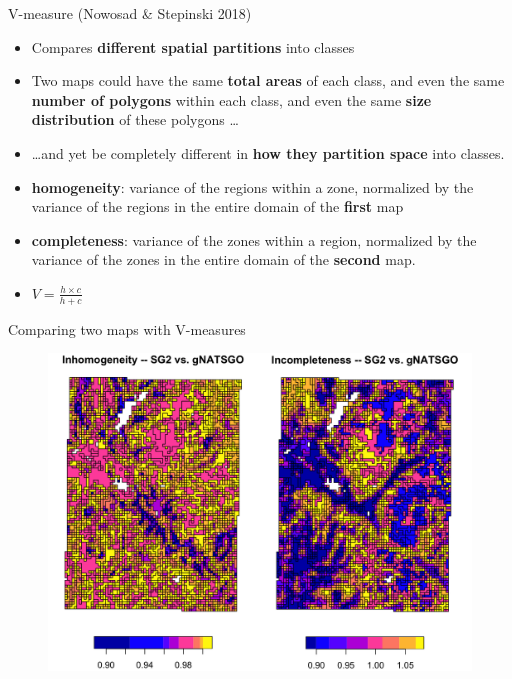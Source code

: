 \documentclass[aspectratio=169, 10pt]{beamer}
\begin{document}
\begin{frame}{V-measure (Nowosad \& Stepinski 2018)}
\begin{itemize}
    \item Compares \textbf{different spatial partitions} into classes
\item Two maps could have the same \textbf{total areas} of each class, and even the same \textbf{number of polygons} within each class, and even the same \textbf{size distribution} of these polygons \ldots
\item \ldots and yet be completely different in \textbf{how they partition space} into classes.
\item \textbf{homogeneity}: variance of the regions within a zone, normalized by the variance of the regions in the entire domain of the \textbf{first} map
\item \textbf{completeness}: variance of the zones within a region, normalized by the variance of the zones in the entire domain of the \textbf{second} map.
\item $V = \frac{h \times c}{h + c}$
\end{itemize}
\end{frame}

\begin{frame}{Comparing two maps with V-measures}
    \begin{figure}
        \centering        \includegraphics[height=0.72\textheight]{graphics_david/Fig16.png}
    \end{figure}
\end{frame}


%    
\end{document}
